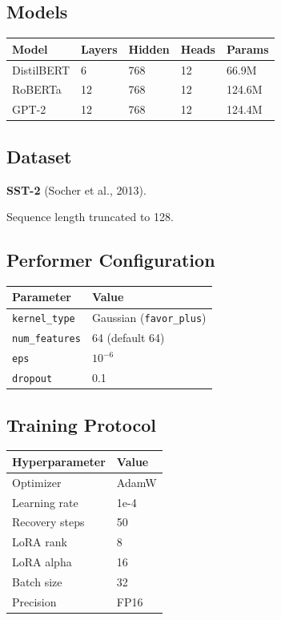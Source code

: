 \subsection{Models}

\begin{table}[H]
\centering
\small
\begin{tabular}{lllll}
\toprule
\textbf{Model} & \textbf{Layers} & \textbf{Hidden} & \textbf{Heads} & \textbf{Params} \\
\midrule
DistilBERT & 6 & 768 & 12 & 66.9M \\
RoBERTa & 12 & 768 & 12 & 124.6M \\
GPT-2 & 12 & 768 & 12 & 124.4M \\
\bottomrule
\end{tabular}
\end{table}

\subsection{Dataset}

\textbf{SST-2} (Socher et al., 2013).

Sequence length truncated to 128.

\subsection{Performer Configuration}

\begin{table}[H]
\centering
\small
\begin{tabular}{ll}
\toprule
\textbf{Parameter} & \textbf{Value} \\
\midrule
\texttt{kernel\_type} & Gaussian (\texttt{favor\_plus}) \\
\texttt{num\_features} & 64 (default 64) \\
\texttt{eps} & $10^{-6}$ \\
\texttt{dropout} & 0.1 \\
\bottomrule
\end{tabular}
\end{table}

\subsection{Training Protocol}

\begin{table}[H]
\centering
\small
\begin{tabular}{ll}
\toprule
\textbf{Hyperparameter} & \textbf{Value} \\
\midrule
Optimizer & AdamW \\
Learning rate & 1e-4 \\
Recovery steps & 50 \\
LoRA rank & 8 \\
LoRA alpha & 16 \\
Batch size & 32 \\
Precision & FP16 \\
\bottomrule
\end{tabular}
\end{table}

